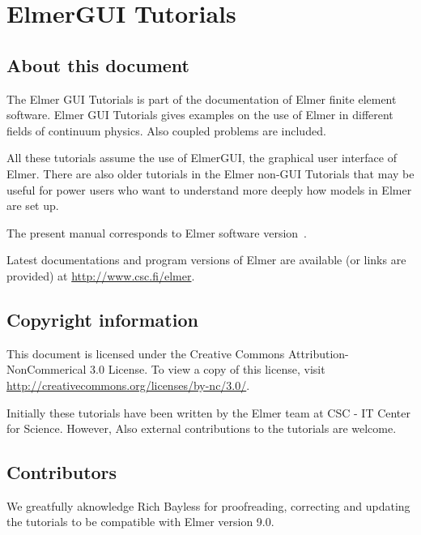 \chapter*{ElmerGUI Tutorials}

\section*{About this document}

The Elmer GUI Tutorials is part of the documentation of Elmer finite element software.
Elmer GUI Tutorials gives examples on the use of Elmer in different fields
of continuum physics. Also coupled problems are included. 

All these tutorials assume the use of ElmerGUI, the graphical user interface of 
Elmer. There are also older tutorials in the Elmer non-GUI Tutorials that 
may be useful for power users who want to understand more deeply 
how models in Elmer are set up.

The present manual corresponds to Elmer software version~\elmerversion{}.

Latest documentations and program versions of Elmer are available (or links are provided) at 
\url{http://www.csc.fi/elmer}. 

\section*{Copyright information}

This document is licensed under the Creative Commons Attribution-NonCommerical 3.0 License. 
To view a copy of this license, visit \url{http://creativecommons.org/licenses/by-nc/3.0/}.

Initially these tutorials have been written by the Elmer team at CSC - IT Center for Science.
However, Also external contributions to the tutorials are welcome.

\section*{Contributors}

We greatfully aknowledge
Rich Bayless for proofreading, correcting and updating the tutorials to be compatible with Elmer version 9.0. 

